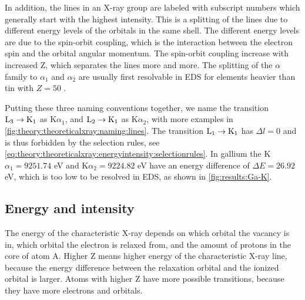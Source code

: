 In addition, the lines in an X-ray group are labeled with subscript numbers which generally start with the highest intensity. %
This is a splitting of the lines due to different energy levels of the orbitals in the same shell.
The different energy levels are due to the spin-orbit coupling, which is the interaction between the electron spin and the orbital angular momentum.
The spin-orbit coupling increase with increased Z, which separates the lines more and more.
The splitting of the $\alpha$ family to $\alpha_1$ and $\alpha_2$ are usually first resolvable in EDS for elements heavier than tin with $ Z = 50$ \cite[Ch. 8.2.2.3]{hollas_modern_2004}. %

Putting these three naming conventions together, we name the transition $\textnormal{L}_3 \rightarrow \textnormal{K}_1$ as K$\alpha_1$, and $\textnormal{L}_2 \rightarrow \textnormal{K}_1$ as K$\alpha_2$, with more examples in \cref{fig:theory:theoreticalxray:naming:lines}.
The transition $\textnormal{L}_1 \rightarrow \textnormal{K}_1$ has $\Delta l = 0$ and is thus forbidden by the selection rules, see \cref{eq:theory:theoreticalxray:energyintensity:selectionrules}.
In gallium the K$\alpha_1 = 9251.74$ eV and K$\alpha_2 = 9224.82$ eV \cite{thompson_x-ray_2004} have an energy difference of $\Delta E = 26.92$ eV, which is too low to be resolved in EDS, as shown in \cref{fig:results:Ga-K}.














\subsection{Energy and intensity}
\label{sec:theory:theoreticalxray:energyintensity}

The energy of the characteristic X-ray depends on which orbital the vacancy is in, which orbital the electron is relaxed from, and the amount of protons in the core of atom A. %
Higher Z means higher energy of the characteristic X-ray line, because the energy difference between the relaxation orbital and the ionized orbital is larger.
Atoms with higher Z have more possible transitions, because they have more  electrons and orbitals.

